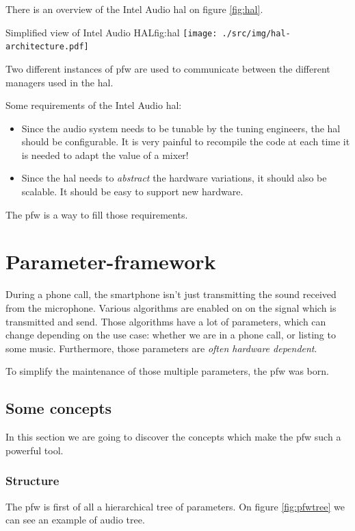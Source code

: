 There is an overview of the Intel Audio \gls{hal} on figure \ref{fig:hal}.
\begin{figureGraphics}{Simplified view of Intel Audio HAL}{fig:hal}
\texttt{[image: ./src/img/hal-architecture.pdf]}
\end{figureGraphics}
Two different instances of \gls{pfw} are used to communicate between the
different managers used in the \gls{hal}.

Some requirements of the Intel Audio \gls{hal}:
\begin{itemize}
    \item Since the audio system needs to be tunable by the tuning engineers, the \gls{hal} should be configurable.
        It is very painful to recompile the code at each time it is needed to adapt the value of a mixer!
    \item Since the \gls{hal} needs to \emph{abstract} the hardware variations, it should also be scalable. It should be
        easy to support new hardware.
\end{itemize}

The \gls{pfw} is a way to fill those requirements.

\section{Parameter-framework}
\label{sec:parameter-framework}
During a phone call, the smartphone isn't just transmitting the sound received from the microphone. Various algorithms are
enabled on on the signal which is transmitted and send.
Those algorithms have a lot of parameters, which can change depending on the use case: whether we are in a phone call,
or listing to some music. Furthermore, those parameters are \emph{often hardware dependent}.

To simplify the maintenance of those multiple parameters, the \gls{pfw} was born.

\subsection{Some concepts}
In this section we are going to discover the concepts which make the
\gls{pfw} such a powerful tool.

\subsubsection{Structure}
The \gls{pfw} is first of all a hierarchical tree of parameters.
On figure \ref{fig:pfwtree} we can see an example of audio tree.

